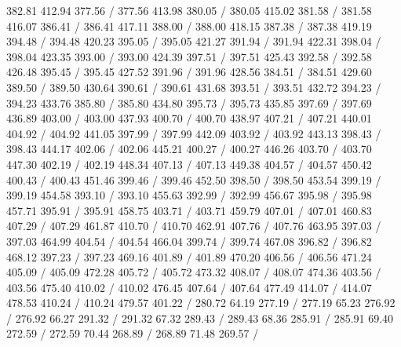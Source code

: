 { 382.81 412.94 377.56 /
 377.56 413.98 380.05 /
 380.05 415.02 381.58 /
 381.58 416.07 386.41 /
 386.41 417.11 388.00 /
 388.00 418.15 387.38 /
 387.38 419.19 394.48 /
 394.48 420.23 395.05 /
 395.05 421.27 391.94 /
 391.94 422.31 398.04 /
 398.04 423.35 393.00 /
 393.00 424.39 397.51 /
 397.51 425.43 392.58 /
 392.58 426.48 395.45 /
 395.45 427.52 391.96 /
 391.96 428.56 384.51 /
 384.51 429.60 389.50 /
 389.50 430.64 390.61 /
 390.61 431.68 393.51 /
 393.51 432.72 394.23 /
 394.23 433.76 385.80 /
 385.80 434.80 395.73 /
 395.73 435.85 397.69 /
 397.69 436.89 403.00 /
 403.00 437.93 400.70 /
 400.70 438.97 407.21 /
 407.21 440.01 404.92 /
 404.92 441.05 397.99 /
 397.99 442.09 403.92 /
 403.92 443.13 398.43 /
 398.43 444.17 402.06 /
 402.06 445.21 400.27 /
 400.27 446.26 403.70 /
 403.70 447.30 402.19 /
 402.19 448.34 407.13 /
 407.13 449.38 404.57 /
 404.57 450.42 400.43 /
 400.43 451.46 399.46 /
 399.46 452.50 398.50 /
 398.50 453.54 399.19 /
 399.19 454.58 393.10 /
 393.10 455.63 392.99 /
 392.99 456.67 395.98 /
 395.98 457.71 395.91 /
 395.91 458.75 403.71 /
 403.71 459.79 407.01 /
 407.01 460.83 407.29 /
 407.29 461.87 410.70 /
 410.70 462.91 407.76 /
 407.76 463.95 397.03 /
 397.03 464.99 404.54 /
 404.54 466.04 399.74 /
 399.74 467.08 396.82 /
 396.82 468.12 397.23 /
 397.23 469.16 401.89 /
 401.89 470.20 406.56 /
 406.56 471.24 405.09 /
 405.09 472.28 405.72 /
 405.72 473.32 408.07 /
 408.07 474.36 403.56 /
 403.56 475.40 410.02 /
 410.02 476.45 407.64 /
 407.64 477.49 414.07 /
 414.07 478.53 410.24 /
 410.24 479.57 401.22 /
\setsolid
{} 280.72 64.19 277.19 /
 277.19 65.23 276.92 /
 276.92 66.27 291.32 /
 291.32 67.32 289.43 /
 289.43 68.36 285.91 /
 285.91 69.40 272.59 /
 272.59 70.44 268.89 /
 268.89 71.48 269.57 /
}
